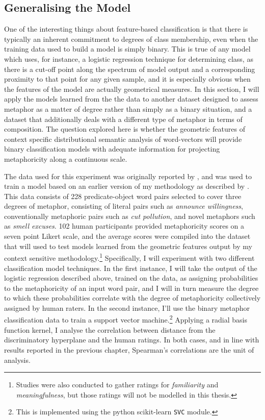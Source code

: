 \subsection{Generalising the Model} \label{sec:genaphor}
One of the interesting things about feature-based classification is that there is typically an inherent commitment to degrees of class membership, even when the training data used to build a model is simply binary.  This is true of any model which uses, for instance, a logistic regression technique for determining class, as there is a cut-off point along the spectrum of model output and a corresponding proximity to that point for any given sample, and it is especially obvious when the features of the model are actually geometrical measures.  In this section, I will apply the models learned from the the \cite{GutierrezEA2016} data to another dataset designed to assess metaphor as a matter of degree rather than simply as a binary situation, and a dataset that additionally deals with a different type of metaphor in terms of composition.  The question explored here is whether the geometric features of context specific distributional semantic analysis of word-vectors will provide binary classification models with adequate information for projecting metaphoricity along a continuous scale.

The data used for this experiment was originally reported by \cite{JankowiakEA2015}, and was used to train a model based on an earlier version of my methodology as described by \cite{AgresEA2016}.  This data consists of 228 predicate-object word pairs selected to cover three degrees of metaphor, consisting of literal pairs such as \emph{announce willingness}, conventionally metaphoric pairs such as \emph{cut pollution}, and novel metaphors such as \emph{smell excuses}.  102 human participants provided metaphoricity scores on a seven point Likert scale, and the average scores were compiled into the dataset that will used to test models learned from the geometric features output by my context sensitive methodology.\footnote{Studies were also conducted to gather ratings for \emph{familiarity} and \emph{meaningfulness}, but those ratings will not be modelled in this thesis.}  Specifically, I will experiment with two different classification model techniques.  In the first instance, I will take the output of the logistic regression described above, trained on the \cite{GutierrezEA2016} data, as assigning probabilities to the metaphoricity of an input word pair, and I will in turn measure the degree to which these probabilities correlate with the degree of metaphoricity collectively assigned by human raters.  In the second instance, I'll use the binary metaphor classification data to train a support vector machine.\footnote{This is implemented using the python scikit-learn \texttt{SVC} module.}  Applying a radial basis function kernel, I analyse the correlation between distance from the discriminatory hyperplane and the human ratings.  In both cases, and in line with results reported in the previous chapter, Spearman's correlations are the unit of analysis.

